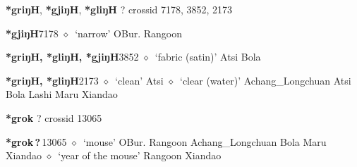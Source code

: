 \item
\textbf{*griŋH}, \textbf{*gjiŋH}, \textbf{*gliŋH}
?
  {\tiny crossid 7178, 3852, 2173}
  \begin{list}{}{\leftmargin=1.5em \itemindent=-1.5em}
  \item {\footnotesize \textbf{*gjiŋH}}{\tiny 7178}
         $\diamond$~`narrow'
         OBur. 
\hspace{1ex}
         Rangoon 
  \item {\footnotesize \textbf{*griŋH, *gliŋH, *gjiŋH}}{\tiny 3852}
\hspace{1ex}
         $\diamond$~`fabric (satin)'
         Atsi 
\hspace{1ex}
         Bola 
  \item {\footnotesize \textbf{*griŋH, *gliŋH}}{\tiny 2173}
\hspace{1ex}
         $\diamond$~`clean'
         Atsi 
\hspace{1ex}
         $\diamond$~`clear (water)'
         Achang\_Longchuan 
\hspace{1ex}
         Atsi 
\hspace{1ex}
         Bola 
\hspace{1ex}
         Lashi 
\hspace{1ex}
         Maru 
\hspace{1ex}
         Xiandao 
  \end{list}
\item
\textbf{*grok}
?
  {\tiny crossid 13065}
  \begin{list}{}{\leftmargin=1.5em \itemindent=-1.5em}
  \item {\footnotesize \textbf{*grok\,?\,}}{\tiny 13065}
         $\diamond$~`mouse'
         OBur. 
\hspace{1ex}
         Rangoon 
\hspace{1ex}
         Achang\_Longchuan 
\hspace{1ex}
         Bola 
\hspace{1ex}
         Maru 
\hspace{1ex}
         Xiandao 
\hspace{1ex}
         $\diamond$~`year of the mouse'
         Rangoon 
\hspace{1ex}
         Xiandao 
  \end{list}

